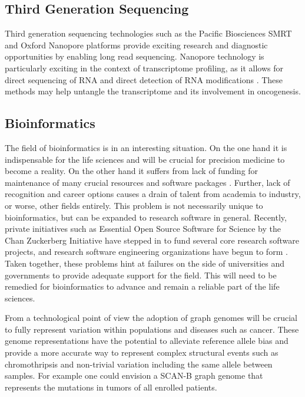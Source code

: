 \documentclass[11pt]{book}
\newcommand{\scanb}{\mbox{SCAN-B}}
\begin{document}
\subsection*{Third Generation Sequencing}

Third generation sequencing technologies such as the Pacific Biosciences SMRT and Oxford Nanopore platforms provide exciting research and diagnostic opportunities by enabling long read sequencing. Nanopore technology is particularly exciting in the context of transcriptome profiling, as it allows for direct sequencing of RNA \cite{Geralde:2018, Soneson:2019, Hardwick:2019} and direct detection of RNA modifications \cite{Leger:2019, Stephenson:2020}. These methods may help untangle the transcriptome and its involvement in oncogenesis.


\subsection*{Bioinformatics}

The field of bioinformatics is in an interesting situation. On the one hand it is indispensable for the life sciences and will be crucial for precision medicine to become a reality. On the other hand it suffers from lack of funding for maintenance of many crucial resources and software packages \cite{Siepel:2019}. Further, lack of recognition and career options causes a drain of talent from academia to industry, or worse, other fields entirely. This problem is not necessarily unique to bioinformatics, but can be expanded to research software in general. Recently, private initiatives such as Essential Open Source Software for Science by the Chan Zuckerberg Initiative \cite{czi} have stepped in to fund several core research software projects, and research software engineering organizations have begun to form \cite{rse}. Taken together, these problems hint at failures on the side of universities and governments to provide adequate support for the field. This will need to be remedied for bioinformatics to advance and remain a reliable part of the life sciences.

From a technological point of view the adoption of graph genomes will be crucial to fully represent variation within populations and diseases such as cancer. These genome representations have the potential to alleviate reference allele bias and provide a more accurate way to represent complex structural events such as chromothripsis and non-trivial variation including the same allele between samples. For example one could envision a \scanb{} graph genome that represents the mutations in tumors of all enrolled patients.
\end{document}

